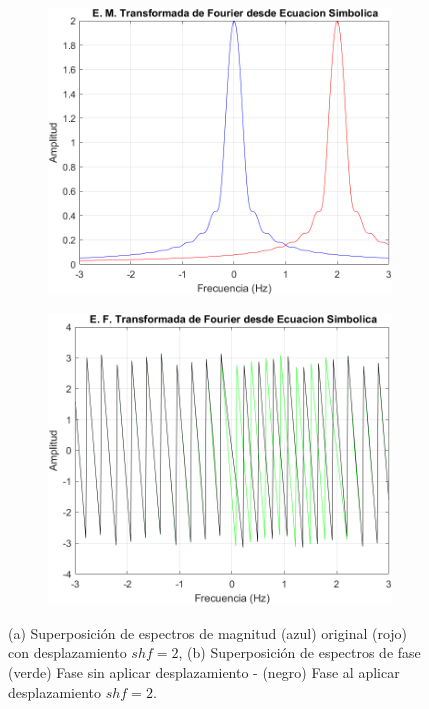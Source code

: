 \documentclass[11pt,letterpaper,twocolumn]{article}
\begin{document}
        \begin{figure}[H]
            \small
            \centering 
            \begin{subfigure}[h]{0.49\linewidth}
                \includegraphics[width=\linewidth]{img/Propfrecmagnitud.png}
                \label{P51}
                \caption{}
            \end{subfigure}
            \begin{subfigure}[h]{0.49\linewidth}
                \includegraphics[width=\linewidth]{img/Propfrecfase.png}
                \label{P52}
                \caption{}
            \end{subfigure}
            \caption{(a) Superposición de espectros de magnitud (azul) original (rojo) con desplazamiento $shf=2$, (b) Superposición de espectros de fase (verde) Fase sin aplicar desplazamiento - (negro) Fase al aplicar desplazamiento $shf=2$.}
            \label{P5}
        \end{figure}
        \vspace{-5mm} 
        
\end{document}
